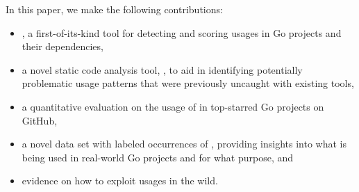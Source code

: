 In this paper, we make the following contributions:
%
\begin{itemize}
\item \toolUsage{}, a first-of-its-kind tool for detecting and scoring \unsafe{} usages in Go projects and their dependencies,
\item a novel static code analysis tool, \toolSA{}, to aid in identifying potentially problematic \unsafe{} usage patterns that were previously uncaught with existing tools,
\item a quantitative evaluation on the usage of \unsafe{} in \projsAnalyzed{} top-starred Go projects on GitHub,
\item a novel data set with  labeled occurrences of \unsafe{}, providing insights into what is being used in real-world Go projects and for what purpose, and
\item evidence on how to exploit \unsafe{} usages in the wild.
\end{itemize}

